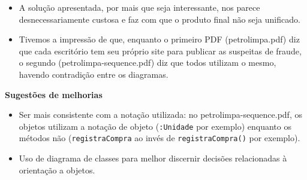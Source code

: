 \documentclass{article}
\begin{document}
\begin{flushleft}
\begin{itemize}
\item A solução apresentada, por mais que seja interessante, nos parece desnecessariamente custosa e faz com que o produto final não seja unificado.

\item Tivemos a impressão de que, enquanto o primeiro PDF (petrolimpa.pdf) diz que cada escritório tem seu próprio site para publicar as suspeitas de fraude, o segundo (petrolimpa-sequence.pdf) diz que todos utilizam o mesmo, havendo contradição entre os diagramas.

\end{itemize}

\bigskip
\bigskip
\textbf{\LARGE{Sugestões de melhorias}}

\begin{itemize}

\item Ser mais consistente com a notação utilizada: no petrolimpa-sequence.pdf, os objetos utilizam a notação de objeto (\texttt{:Unidade} por exemplo) enquanto os métodos não (\texttt{registraCompra} ao invés de \texttt{registraCompra()} por exemplo).

\item Uso de diagrama de classes para melhor discernir decisões relacionadas à orientação a objetos.

\end{itemize}
\end{flushleft}
\end{document}
